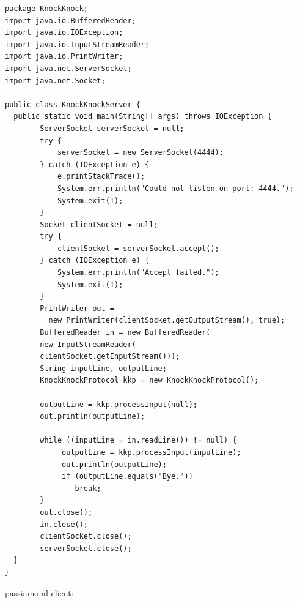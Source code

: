 \documentclass[a4paper,12pt, oneside]{book}
\begin{document}
\begin{verbatim}
package KnockKnock;
import java.io.BufferedReader;
import java.io.IOException;
import java.io.InputStreamReader;
import java.io.PrintWriter;
import java.net.ServerSocket;
import java.net.Socket;

public class KnockKnockServer {
  public static void main(String[] args) throws IOException {
        ServerSocket serverSocket = null;
        try {
            serverSocket = new ServerSocket(4444);
        } catch (IOException e) {
            e.printStackTrace();
            System.err.println("Could not listen on port: 4444.");
            System.exit(1);
        }
        Socket clientSocket = null;
        try {
            clientSocket = serverSocket.accept();
        } catch (IOException e) {
            System.err.println("Accept failed.");
            System.exit(1);
        }
        PrintWriter out = 
          new PrintWriter(clientSocket.getOutputStream(), true);
        BufferedReader in = new BufferedReader(
        new InputStreamReader(
        clientSocket.getInputStream()));
        String inputLine, outputLine;
        KnockKnockProtocol kkp = new KnockKnockProtocol();

        outputLine = kkp.processInput(null);
        out.println(outputLine);

        while ((inputLine = in.readLine()) != null) {
             outputLine = kkp.processInput(inputLine);
             out.println(outputLine);
             if (outputLine.equals("Bye."))
                break;
        }
        out.close();
        in.close();
        clientSocket.close();
        serverSocket.close();
  }
}

\end{verbatim}
passiamo al client:
\end{document}
